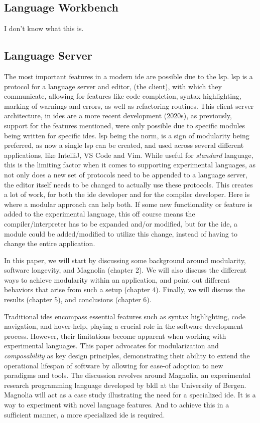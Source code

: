 \subsection{Language Workbench}
I don't know what this is.

\subsection{Language Server}

The most important features in a modern \gls{ide} are possible due to the
\gls{lsp}. \gls{lsp} is a protocol for a language server and editor,
(the client), with which they communicate, allowing for features like code
completion, syntax highlighting, marking of warnings and errors, as well as
refactoring routines. This client-server architecture, in \gls{ide}s are a
more recent development (2020s), as previously, support for the features
mentioned, were only possible due to specific modules being written for
specific \gls{ide}s. \gls{lsp} being the norm, is a sign of modularity being
preferred, as now a single \gls{lsp} can be created, and used across several
different applications, like IntelliJ, VS Code and Vim. While useful for
\textit{standard} language, this is the limiting factor when it comes to
supporting experimental languages, as not only does a new set of protocols need
to be appended to a language server, the editor itself needs to be changed to
actually use these protocols. This creates a lot of work, for both the \gls{ide}
developer and for the compiler developer. Here is where a modular approach can
help both. If some new functionality or feature is added to the experimental
language, this off course means the compiler/interpreter has to be expanded
and/or modified, but for the \gls{ide}, a module could be added/modified to
utilize this change, instead of having to change the entire application.

In this paper, we will start by discussing some background around modularity,
software longevity, and Magnolia (chapter 2). We will also discuss the different
ways to achieve modularity within an application, and point out different
behaviors that arise from such a setup (chapter 4). Finally, we will discuss the
results (chapter 5), and conclusions (chapter 6).

Traditional \gls{ide}s encompass essential features such as syntax highlighting, code
navigation, and hover-help, playing a crucial role in the software development
process. However, their limitations become apparent when working with
experimental languages. This paper advocates for modularization and
\textit{composability} as key design principles, demonstrating their ability to
extend the operational lifespan of software by allowing for ease-of adoption to
new paradigms and tools. The discussion revolves around Magnolia, an
experimental research programming language developed by \gls{bldl} at the
University of Bergen. Magnolia will act as a case study illustrating the need for
a specialized \gls{ide}. It is a way to experiment with novel language features.
And to achieve this in a sufficient manner, a more specialized \gls{ide} is
required.


